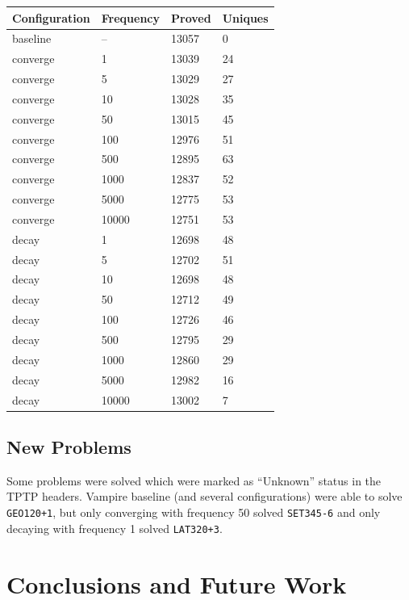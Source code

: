 \documentclass{llncs}
\begin{document}
\begin{center}
\begin{tabular}{l l l l}
	Configuration & Frequency & Proved & Uniques\\
	\hline
	baseline & -- & 13057 & 0\\
	converge & 1 & 13039 & 24\\
	converge & 5 & 13029 & 27\\
	converge & 10 & 13028 & 35\\
	converge & 50 & 13015 & 45\\
	converge & 100 & 12976 & 51\\
	converge & 500 & 12895 & 63\\
	converge & 1000 & 12837 & 52\\
	converge & 5000 & 12775 & 53\\
	converge & 10000 & 12751 & 53\\
	decay & 1 & 12698 & 48\\
	decay & 5 & 12702 & 51\\
	decay & 10 & 12698 & 48\\
	decay & 50 & 12712 & 49\\
	decay & 100 & 12726 & 46\\
	decay & 500 & 12795 & 29\\
	decay & 1000 & 12860 & 29\\
	decay & 5000 & 12982 & 16\\
	decay & 10000 & 13002 & 7\\
\end{tabular}
\end{center}

\subsection{New Problems}
Some problems were solved which were marked as ``Unknown'' status in the TPTP headers.
Vampire baseline (and several configurations) were able to solve \texttt{GEO120+1}, but only converging with frequency 50 solved \texttt{SET345-6} and only decaying with frequency 1 solved \texttt{LAT320+3}.


\section{Conclusions and Future Work}
\label{sec:conclusions}




\end{document}
